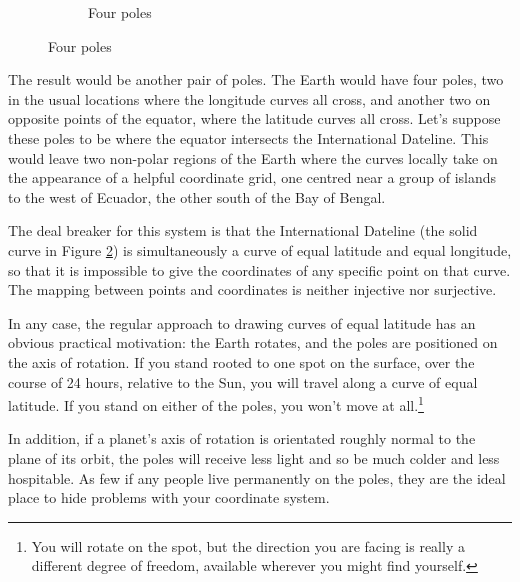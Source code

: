 \begin{figure}[h]
\begin{subfigure}{0.5\textwidth}
    \caption{Four poles} \label{fig:globe-terrible}
    \end{subfigure}
\end{figure}

The result would be another pair of poles. The Earth would have four poles, two in the usual locations where the longitude curves all cross, and another two on opposite points of the equator, where the latitude curves all cross. Let's suppose these poles to be where the equator intersects the International Dateline. This would leave two non-polar regions of the Earth where the curves locally take on the appearance of a helpful coordinate grid, one centred near a group of islands to the west of Ecuador, the other south of the Bay of Bengal.

The deal breaker for this system is that the International Dateline (the solid curve in Figure \ref{fig:globe-terrible}) is simultaneously a curve of equal latitude and equal longitude, so that it is impossible to give the coordinates of any specific point on that curve. The mapping between points and coordinates is neither injective nor surjective.

In any case, the regular approach to drawing curves of equal latitude has an obvious practical motivation: the Earth rotates, and the poles are positioned on the axis of rotation. If you stand rooted to one spot on the surface, over the course of 24 hours, relative to the Sun, you will travel along a curve of equal latitude. If you stand on either of the poles, you won't move at all.\footnote{You will rotate on the spot, but the direction you are facing is really a different degree of freedom, available wherever you might find yourself.}

In addition, if a planet's axis of rotation is orientated roughly normal to the plane of its orbit, the poles will receive less light and so be much colder and less hospitable. As few if any people live permanently on the poles, they are the ideal place to hide problems with your coordinate system.

